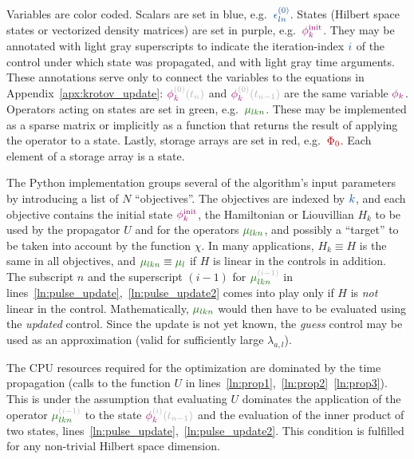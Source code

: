 \documentclass[submission, Phys]{SciPost}
\newcommand{\VarScalar}[1]{{\color{clVarScalar}#1}}
\newcommand{\VarState}[1]{\ensuremath{\textcolor{clVarState}{#1}}}
\newcommand{\PropAnnotation}[1]{\textcolor{black!30}{#1}}
\newcommand{\VarPropState}[4]{\ensuremath{\VarState{#1}_{\textcolor{clVarState}{#2}}^{\PropAnnotation{#3}}\PropAnnotation{(#4)}}}  %
\newcommand{\VarOperator}[2]{{\color{clVarOperator}#1_{#2}}} %
\newcommand{\VarArray}[1]{{\color{clVarArray}#1}}
\begin{document}
Variables are color coded.
Scalars are set in blue, e.g.\ $\VarScalar{\epsilon_{ln}^{(0)}}$.
States  (Hilbert space states or vectorized density matrices) are set in purple,
e.g.\ $\VarState{\phi_k^{\text{init}}}$.
They may be annotated with light gray superscripts to indicate the
iteration-index $\VarScalar{i}$ of the control under which state was propagated,
and with light gray time arguments.
These annotations serve only to connect the variables to the equations in
Appendix~\ref{apx:krotov_update}: $\VarPropState{\phi}{k}{(0)}{t_n}$ and
$\VarPropState{\phi}{k}{(0)}{t_{n-1}}$ are the same variable
$\VarState{\phi_k}$.
Operators acting on states are set in green, e.g.\ $\VarOperator{\mu}{lkn}$.
These may be implemented as a sparse matrix or implicitly as a function that
returns the result of applying the operator to a state.
Lastly, storage arrays are set in red, e.g.\ $\VarArray{\Phi_0}$.
Each element of a storage array is a state.

The Python implementation groups several of the algorithm's input parameters by
introducing a list of $N$ ``objectives''.
The objectives are indexed by $\VarScalar{k}$, and each objective contains the
initial state $\VarState{\phi_k^{\text{init}}}$, the Hamiltonian or Liouvillian
$H_k$ to be used by the propagator $U$ and for the operators
$\VarOperator{\mu}{lkn}$, and possibly a ``target'' to be taken into account by
the function $\chi$.
In many applications, $H_k \equiv H$ is the same in all objectives, and
$\VarOperator{\mu}{lkn} \equiv \VarOperator{\mu}{l}$ if $H$ is linear in the
controls in addition.
The subscript $n$ and the superscript $(i-1)$ for
$\VarOperator{\mu^{\PropAnnotation{(i-1)}}}{lkn}$ in
lines~\ref{ln:pulse_update},~\ref{ln:pulse_update2} comes into play only if $H$
is \emph{not} linear in the control.
Mathematically, $\VarOperator{\mu}{lkn}$ would then have to be evaluated using
the \emph{updated} control.
Since the update is not yet known, the \emph{guess} control may be used as an
approximation (valid for sufficiently large $\lambda_{a,l}$).

The CPU resources required for the optimization are dominated by the time
propagation (calls to the function $U$ in
lines~\ref{ln:prop1},~\ref{ln:prop2}~\ref{ln:prop3}). This is under the
assumption that evaluating $U$ dominates the application of the operator
$\VarOperator{\mu^{\PropAnnotation{(i-1)}}}{lkn}$
to the state $\VarPropState{\phi}{k}{(i)}{t_{n-1}}$ and
the evaluation of the inner product of two states,
lines~\ref{ln:pulse_update},~\ref{ln:pulse_update2}.
This condition is fulfilled for any non-trivial Hilbert space dimension.
\end{document}
